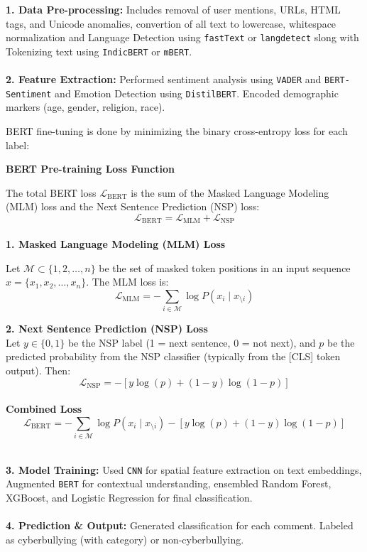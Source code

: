\textbf{1. Data Pre-processing:} Includes removal of user mentions, URLs, HTML tags, and Unicode anomalies, convertion of all text to lowercase, whitespace normalization and Language Detection using \texttt{fastText} or \texttt{langdetect} slong with Tokenizing text using \texttt{IndicBERT} or \texttt{mBERT}.  \\
\text{ } \\
\textbf{2. Feature Extraction:}  Performed sentiment analysis using \texttt{VADER} and \texttt{BERT-Sentiment} and Emotion Detection using \texttt{DistilBERT}. Encoded demographic markers (age, gender, religion, race).  \\

\begin{algorithmic}
\State BERT fine-tuning is done by minimizing the binary cross-entropy loss for each label:

\textbf{BERT Pre-training Loss Function}

The total BERT loss \( \mathcal{L}_{\text{BERT}} \) is the sum of the Masked Language Modeling (MLM) loss and the Next Sentence Prediction (NSP) loss:
\\
\[
\mathcal{L}_{\text{BERT}} = \mathcal{L}_{\text{MLM}} + \mathcal{L}_{\text{NSP}}
\]
\\
\textbf{1. Masked Language Modeling (MLM) Loss}

Let \( \mathcal{M} \subset \{1, 2, \dots, n\} \) be the set of masked token positions in an input sequence \( x = \{x_1, x_2, \dots, x_n\} \). The MLM loss is:
\\
\[
\mathcal{L}_{\text{MLM}} = - \sum_{i \in \mathcal{M}} \log P(x_i \mid x_{\setminus i})
\]

\textbf{2. Next Sentence Prediction (NSP) Loss}
\\
Let \( y \in \{0, 1\} \) be the NSP label (1 = next sentence, 0 = not next), and \( p \) be the predicted probability from the NSP classifier (typically from the [CLS] token output). Then:
\\
\[
\mathcal{L}_{\text{NSP}} = - \left[ y \log(p) + (1 - y) \log(1 - p) \right]
\]
\\
\textbf{Combined Loss}
\\
\[
\mathcal{L}_{\text{BERT}} = - \sum_{i \in \mathcal{M}} \log P(x_i \mid x_{\setminus i}) - \left[ y \log(p) + (1 - y) \log(1 - p) \right]
\]

\end{algorithmic}

\text{ } \\
\textbf{3. Model Training:} Used \texttt{CNN} for spatial feature extraction on text embeddings, Augmented \texttt{BERT} for contextual understanding, ensembled Random Forest, XGBoost, and Logistic Regression for final classification. \\
\text{ } \\
\textbf{4. Prediction \& Output:} Generated classification for each comment. Labeled as cyberbullying (with category) or non-cyberbullying. \\